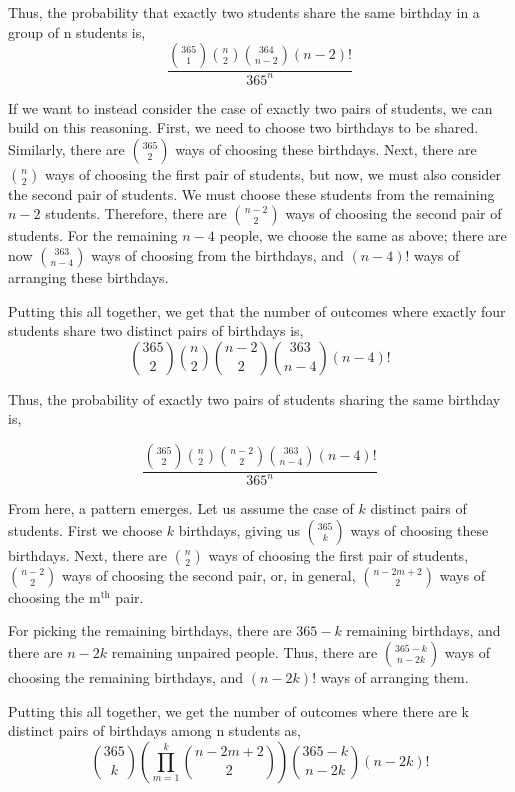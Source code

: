 \documentclass[12pt, letterpaper]{book}
\begin{document}
	Thus, the probability that exactly two students share the same birthday in a group of n students is,
	\begin{equation}
		\frac{\binom{365}{1}\binom{n}{2}\binom{364}{n-2}\left(n-2\right)!}{365^n}
	\end{equation}
	
	If we want to instead consider the case of exactly two pairs of students, we can build on this reasoning. First, we need to choose two birthdays to be shared. Similarly, there are \(\binom{365}{2}\) ways of choosing these birthdays. Next, there are \(\binom{n}{2}\) ways of choosing the first pair of students, but now, we must also consider the second pair of students. We must choose these students from the remaining \(n-2\) students. Therefore, there are \(\binom{n-2}{2}\) ways of choosing the second pair of students. For the remaining \(n-4\) people, we choose the same as above; there are now \(\binom{363}{n-4}\) ways of choosing from the birthdays, and \(\left(n-4\right)!\) ways of arranging these birthdays.
	
	Putting this all together, we get that the number of outcomes where exactly four students share two distinct pairs of birthdays is,
	\begin{equation}
		\binom{365}{2}\binom{n}{2}\binom{n-2}{2}\binom{363}{n-4}\left(n-4\right)!
	\end{equation}

	Thus, the probability of exactly two pairs of students sharing the same birthday is,
	
	\begin{equation}
		\frac{\binom{365}{2}\binom{n}{2}\binom{n-2}{2}\binom{363}{n-4}\left(n-4\right)!}{365^n}
	\end{equation}
	
	From here, a pattern emerges. Let us assume the case of \(k\) distinct pairs of students. First we choose \(k\) birthdays, giving us \(\binom{365}{k}\) ways of choosing these birthdays. Next, there are \(\binom{n}{2}\) ways of choosing the first pair of students, \(\binom{n-2}{2}\) ways of choosing the second pair, or, in general, \(\binom{n- 2m + 2}{2}\) ways of choosing the \(\text{m}^{\text{th}}\) pair.
	
	For picking the remaining birthdays, there are \(365-k\) remaining birthdays, and there are \(n-2k\) remaining unpaired people. Thus, there are \(\binom{365-k}{n-2k}\) ways of choosing the remaining birthdays, and \(\left(n-2k\right)!\) ways of arranging them.
	
	Putting this all together, we get the number of outcomes where there are k distinct pairs of birthdays among n students as,
	\begin{equation}
		\binom{365}{k}\left(\prod_{m=1}^{k}{\binom{n-2m+2}{2}}\right)\binom{365-k}{n-2k}\left(n-2k\right)!
	\end{equation}
\end{document}
